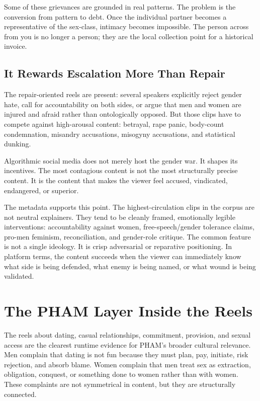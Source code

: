 \documentclass[12pt]{article}
\begin{document}
Some of these grievances are grounded in real patterns. The problem is the conversion from pattern to debt. Once the individual partner becomes a representative of the sex-class, intimacy becomes impossible. The person across from you is no longer a person; they are the local collection point for a historical invoice.

\subsection{It Rewards Escalation More Than Repair}

The repair-oriented reels are present: several speakers explicitly reject gender hate, call for accountability on both sides, or argue that men and women are injured and afraid rather than ontologically opposed. But those clips have to compete against high-arousal content: betrayal, rape panic, body-count condemnation, misandry accusations, misogyny accusations, and statistical dunking.

Algorithmic social media does not merely host the gender war. It shapes its incentives. The most contagious content is not the most structurally precise content. It is the content that makes the viewer feel accused, vindicated, endangered, or superior.

The metadata supports this point. The highest-circulation clips in the corpus are not neutral explainers. They tend to be cleanly framed, emotionally legible interventions: accountability against women, free-speech/gender tolerance claims, pro-men feminism, reconciliation, and gender-role critique. The common feature is not a single ideology. It is crisp adversarial or reparative positioning. In platform terms, the content succeeds when the viewer can immediately know what side is being defended, what enemy is being named, or what wound is being validated.

\section{The PHAM Layer Inside the Reels}

The reels about dating, casual relationships, commitment, provision, and sexual access are the clearest runtime evidence for PHAM's broader cultural relevance. Men complain that dating is not fun because they must plan, pay, initiate, risk rejection, and absorb blame. Women complain that men treat sex as extraction, obligation, conquest, or something done to women rather than with women. These complaints are not symmetrical in content, but they are structurally connected.
\end{document}
